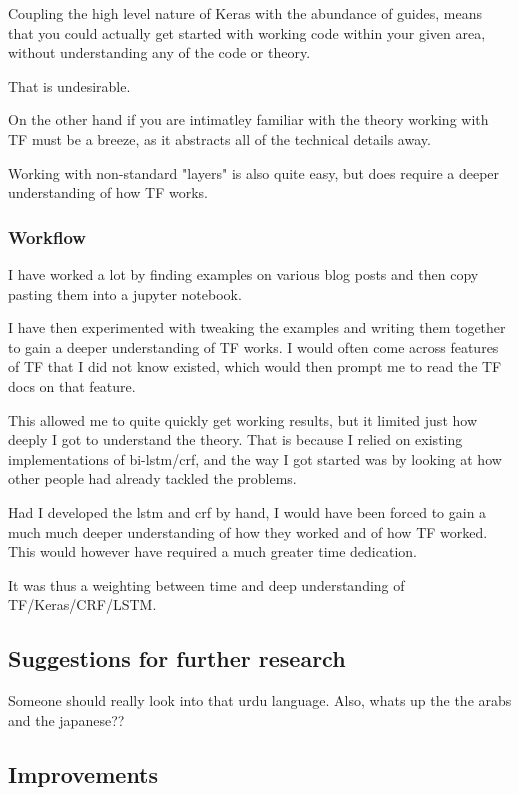 Coupling the high level nature of Keras with the abundance of guides, means that you could actually get started with working code within your given area, without understanding any of the code or theory.

That is undesirable.

On the other hand if you are intimatley familiar with the theory working with TF must be a breeze, as it abstracts all of the technical details away.

Working with non-standard "layers" is also quite easy, but does require a deeper understanding of how TF works.

\subsubsection{Workflow}

I have worked a lot by finding examples on various blog posts and then copy pasting them into a jupyter notebook.

I have then experimented with tweaking the examples and writing them together to gain a deeper understanding of TF works. I would often come across features of TF that I did not know existed, which would then prompt me to read the TF docs on that feature.

This allowed me to quite quickly get working results, but it limited just how deeply I got to understand the theory. That is because I relied on existing implementations of bi-lstm/crf, and the way I got started was by looking at how other people had already tackled the problems.

Had I developed the lstm and crf by hand, I would have been forced to gain a much much deeper understanding of how they worked and of how TF worked. This would however have required a much greater time dedication.

It was thus a weighting between time and deep understanding of TF/Keras/CRF/LSTM.


\subsection{Suggestions for further research}

Someone should really look into that urdu language. Also, whats up the the arabs
and the japanese??

\subsection{Improvements}

